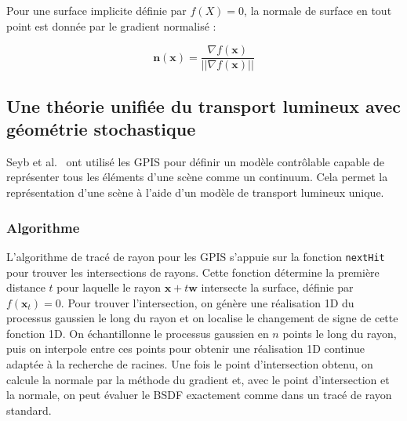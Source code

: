 Pour une surface implicite définie par $f(X) = 0$, la normale de surface en tout point est donnée par le gradient normalisé :

\begin{equation}
\mathbf{n}(\mathbf{x}) = \frac{\nabla f(\mathbf{x})}{||\nabla f(\mathbf{x})||}
\end{equation}

\subsection{Une théorie unifiée du transport lumineux avec géométrie stochastique}

Seyb et al.~\cite{seyb24from} ont utilisé les GPIS pour définir un modèle contrôlable capable de représenter tous les éléments d'une scène comme un continuum. Cela permet la représentation d'une scène à l'aide d'un modèle de transport lumineux unique.

\subsubsection{Algorithme}

L'algorithme de tracé de rayon pour les GPIS s'appuie sur la fonction \texttt{nextHit} pour trouver les intersections de rayons. Cette fonction détermine la première distance $t$ pour laquelle le rayon $\mathbf{x} + t\mathbf{w}$ intersecte la surface, définie par $f(\mathbf{x}_t) = 0$. Pour trouver l'intersection, on génère une réalisation 1D du processus gaussien le long du rayon et on localise le changement de signe de cette fonction 1D. On échantillonne le processus gaussien en $n$ points le long du rayon, puis on interpole entre ces points pour obtenir une réalisation 1D continue adaptée à la recherche de racines. Une fois le point d'intersection obtenu, on calcule la normale par la méthode du gradient et, avec le point d'intersection et la normale, on peut évaluer le BSDF exactement comme dans un tracé de rayon standard.

